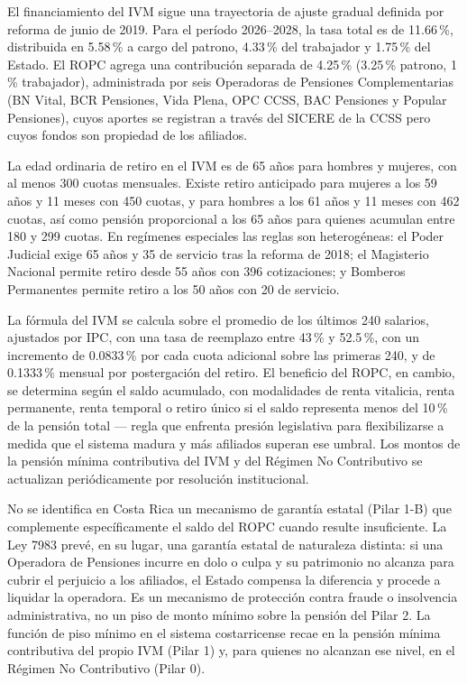 \documentclass[12pt, letterpaper]{article}
\begin{document}
El financiamiento del IVM sigue una trayectoria de ajuste gradual definida por reforma de junio de 2019. Para el período 2026--2028, la tasa total es de 11.66\,\%, distribuida en 5.58\,\% a cargo del patrono, 4.33\,\% del trabajador y 1.75\,\% del Estado. El ROPC agrega una contribución separada de 4.25\,\% (3.25\,\% patrono, 1\,\% trabajador), administrada por seis Operadoras de Pensiones Complementarias (BN Vital, BCR Pensiones, Vida Plena, OPC CCSS, BAC Pensiones y Popular Pensiones), cuyos aportes se registran a través del SICERE de la CCSS pero cuyos fondos son propiedad de los afiliados.

La edad ordinaria de retiro en el IVM es de 65 años para hombres y mujeres, con al menos 300 cuotas mensuales. Existe retiro anticipado para mujeres a los 59 años y 11 meses con 450 cuotas, y para hombres a los 61 años y 11 meses con 462 cuotas, así como pensión proporcional a los 65 años para quienes acumulan entre 180 y 299 cuotas. En regímenes especiales las reglas son heterogéneas: el Poder Judicial exige 65 años y 35 de servicio tras la reforma de 2018; el Magisterio Nacional permite retiro desde 55 años con 396 cotizaciones; y Bomberos Permanentes permite retiro a los 50 años con 20 de servicio.

La fórmula del IVM se calcula sobre el promedio de los últimos 240 salarios, ajustados por IPC, con una tasa de reemplazo entre 43\,\% y 52.5\,\%, con un incremento de 0.0833\,\% por cada cuota adicional sobre las primeras 240, y de 0.1333\,\% mensual por postergación del retiro. El beneficio del ROPC, en cambio, se determina según el saldo acumulado, con modalidades de renta vitalicia, renta permanente, renta temporal o retiro único si el saldo representa menos del 10\,\% de la pensión total --- regla que enfrenta presión legislativa para flexibilizarse a medida que el sistema madura y más afiliados superan ese umbral. Los montos de la pensión mínima contributiva del IVM y del Régimen No Contributivo se actualizan periódicamente por resolución institucional.

No se identifica en Costa Rica un mecanismo de garantía estatal (Pilar 1-B) que complemente específicamente el saldo del ROPC cuando resulte insuficiente. La Ley 7983 prevé, en su lugar, una garantía estatal de naturaleza distinta: si una Operadora de Pensiones incurre en dolo o culpa y su patrimonio no alcanza para cubrir el perjuicio a los afiliados, el Estado compensa la diferencia y procede a liquidar la operadora. Es un mecanismo de protección contra fraude o insolvencia administrativa, no un piso de monto mínimo sobre la pensión del Pilar 2. La función de piso mínimo en el sistema costarricense recae en la pensión mínima contributiva del propio IVM (Pilar 1) y, para quienes no alcanzan ese nivel, en el Régimen No Contributivo (Pilar 0).
\end{document}
